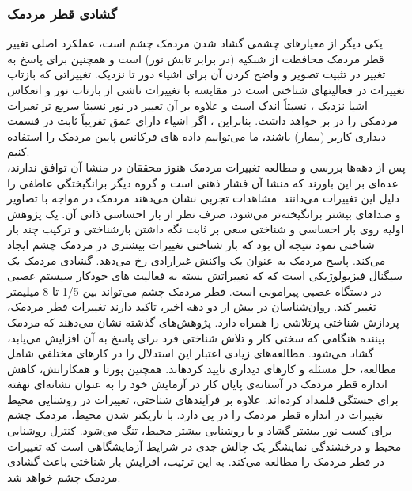 \subsubsection{گشادی قطر مردمک}
یکی دیگر از معيارهای چشمی گشاد شدن مردمک چشم
است،
عملکرد اصلی تغییر قطر مردمک محافظت از شبکیه (در برابر تابش نور) است و همچنین برای پاسخ به تغییر در تثبیت تصویر و واضح کردن آن برای اشیاء دور تا نزدیک.
تغییراتی که بازتاب تغییرات در فعالیتهای شناختی است در مقایسه با تغییرات ناشی از بازتاب نور و انعکاس اشیا نزدیک ، نسبتاً اندک است و علاوه بر آن تغییر در نور نسبتا سریع تر تغیرات مردمکی را در بر خواهد داشت.
بنابراین ، اگر اشیاء دارای عمق تقریباً ثابت در قسمت دیداری کاربر (بیمار) باشند، ما می‌توانیم داده های فرکانس پایین مردمک را استفاده کنیم.
\\
پس از دهه‌ها بررسی و مطالعه تغییرات مردمک هنوز محققان در منشا آن توافق ندارند، عده‌ای بر این باورند که منشا آن فشار ذهنی است و گروه دیگر برانگیختگی عاطفی را دلیل این تغییرات می‌دانند.
مشاهدات تجربی نشان می‌دهند مردمک در مواجه با تصاویر و صداهای بیشتر برانگیخته‌تر می‌شود، صرف نظر از بار احساسی ذاتی آن.
یک پژوهش اولیه روی بار احساسی و شناختی سعی بر ثابت نگه داشتن بارشناختی و ترکیب چند بار شناختی نمود نتیجه آن بود که بار شناختی تغییرات بیشتری در مردمک چشم ایجاد می‌کند.
\cite{Chen2013}
 پاسخ مردمک به عنوان یک واكنش غيرارادی رخ می‌دهد.
گشادی مردمک یک سیگنال فیزیولوژیکی است که که تغییراتش بسته به فعالیت های خودکار سیستم عصبی در دستگاه عصبی پیرامونی است.
قطر مردمک چشم می‌تواند بين  1/5 تا 8 ميلیمتر تغيير كند. روان‌شناسان در بيش از دو دهه اخير، تاكيد دارند 
تغييرات قطر مردمک، پردازش شناختی پرتلاشی را همراه دارد. پژوهش‌های گذشته نشان می‌دهند كه 
مردمک  بيننده  هنگامی  كه  سختی  كار  و  تلاش  شناختی  فرد  برای  پاسخ  به  آن  افزایش  می‌یابد،  گشاد 
می‌شود. مطالعه‌های زیادی اعتبار این استدلال را در كارهای مختلفی شامل مطالعه، حل مسئله و كارهای
دیداری تایيد كردهاند.
\cite{zagermann2016measuring}
همچنين پورتا و همکارانش، كاهش اندازه قطر مردمک در آستانه‌ی پایان كار در  آزمایش  خود  را  به  عنوان  نشانه‌ای  نهفته  برای  خستگی  قلمداد  كرده‌اند.
\cite{porta2012emotional}
علاوه  بر  فرآیندهای شناختی، تغييرات  در  روشنایی  محيط  تغييرات  در  اندازه  قطر  مردمک  را  در  پی  دارد.  با  تاریکتر  شدن محيط،  مردمک  چشم  برای  كسب  نور  بيشتر  گشاد  و  با  روشنایی  بيشتر  محيط، تنگ  می‌شود.  كنترل 
روشنایی محيط و درخشندگی نمایشگر یک چالش جدی در شرایط آزمایشگاهی است كه تغييرات در قطر مردمک  را  مطالعه  می‌كند.
\cite{zagermann2016measuring}
به  این ترتيب، افزایش  بار شناختی  باعث  گشادی مردمک چشم خواهد شد.
